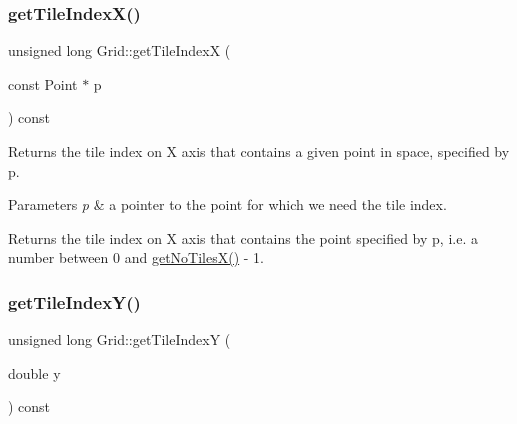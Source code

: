 \mbox{\label{class_grid_af4094832e2adedbbd47889973f5a40da}} 
\subsubsection{\texorpdfstring{get\+Tile\+Index\+X()}{getTileIndexX()}\hspace{0.1cm}{\footnotesize\ttfamily [2/2]}}
{\footnotesize\ttfamily unsigned long Grid\+::get\+Tile\+IndexX (\begin{DoxyParamCaption}\item[{const Point $\ast$}]{p }\end{DoxyParamCaption}) const\hspace{0.3cm}{\ttfamily [private]}}

Returns the tile index on X axis that contains a given point in space, specified by p. 
\begin{DoxyParams}{Parameters}
{\em p} & a pointer to the point for which we need the tile index. \\
\hline
\end{DoxyParams}
\begin{DoxyReturn}{Returns}
the tile index on X axis that contains the point specified by p, i.\+e. a number between 0 and \hyperlink{class_grid_af29c0c404a908aa46f83afb17d7609a6}{get\+No\+Tiles\+X()} -\/ 1. 
\end{DoxyReturn}
\mbox{\label{class_grid_ad745f856bb2b27382118ac03fafc06b4}} 
\subsubsection{\texorpdfstring{get\+Tile\+Index\+Y()}{getTileIndexY()}\hspace{0.1cm}{\footnotesize\ttfamily [1/2]}}
{\footnotesize\ttfamily unsigned long Grid\+::get\+Tile\+IndexY (\begin{DoxyParamCaption}\item[{double}]{y }\end{DoxyParamCaption}) const\hspace{0.3cm}{\ttfamily [private]}}

\mbox{\label{class_grid_ae1eeb3b42007ae1cf19cfaf0d846fb9a}} 
